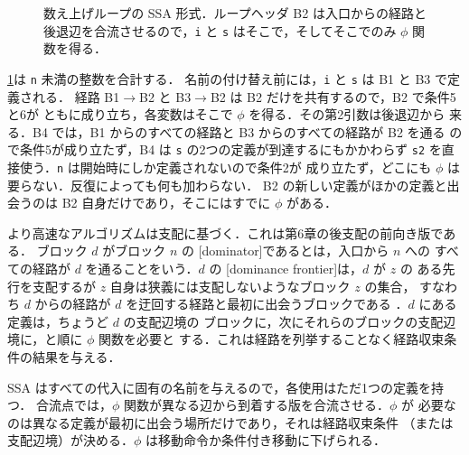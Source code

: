 \documentclass[../main.tex]{subfiles}
\begin{document}
\begin{figure}[tb]
  \centering
  
  \caption{数え上げループの SSA 形式．ループヘッダ B2 は入口からの経路と
    後退辺を合流させるので，\texttt{i} と \texttt{s} はそこで，そしてそこでのみ
    $\phi$ 関数を得る．}
  \label{fig:l11-path-convergence}
\end{figure}

\begin{example}
  \label{ex:l11-path-convergence}
  \cref{fig:l11-path-convergence}は \texttt{n} 未満の整数を合計する．
  名前の付け替え前には，\texttt{i} と \texttt{s} は B1 と B3 で定義される．
  経路 B1$\to$B2 と B3$\to$B2 は B2 だけを共有するので，B2 で条件5と6が
  ともに成り立ち，各変数はそこで $\phi$ を得る．その第2引数は後退辺から
  来る．B4 では，B1 からのすべての経路と B3 からのすべての経路が B2 を通る
  ので条件5が成り立たず，B4 は \texttt{s} の2つの定義が到達するにもかかわらず
  \texttt{s2} を直接使う．\texttt{n} は開始時にしか定義されないので条件2が
  成り立たず，どこにも $\phi$ は要らない．反復によっても何も加わらない．
  B2 の新しい定義がほかの定義と出会うのは B2 自身だけであり，そこにはすでに
  $\phi$ がある．
\end{example}

より高速なアルゴリズムは支配に基づく．これは第6章の後支配の前向き版である．
ブロック $d$ がブロック $n$ の
[dominator]であるとは，入口から $n$ への
すべての経路が $d$ を通ることをいう．$d$ の
[dominance frontier]は，$d$ が $z$ の
ある先行を支配するが $z$ 自身は狭義には支配しないようなブロック $z$ の集合，
すなわち $d$ からの経路が $d$ を迂回する経路と最初に出会うブロックである
\cite{cytron1991ssa}．$d$ にある定義は，ちょうど $d$ の支配辺境の
ブロックに，次にそれらのブロックの支配辺境に，と順に $\phi$ 関数を必要と
する．これは経路を列挙することなく経路収束条件の結果を与える．

\begin{keypoint}
  SSA はすべての代入に固有の名前を与えるので，各使用はただ1つの定義を持つ．
  合流点では，$\phi$ 関数が異なる辺から到着する版を合流させる．$\phi$ が
  必要なのは異なる定義が最初に出会う場所だけであり，それは経路収束条件
  （または支配辺境）が決める．$\phi$ は移動命令か条件付き移動に下げられる．
\end{keypoint}
\end{document}
